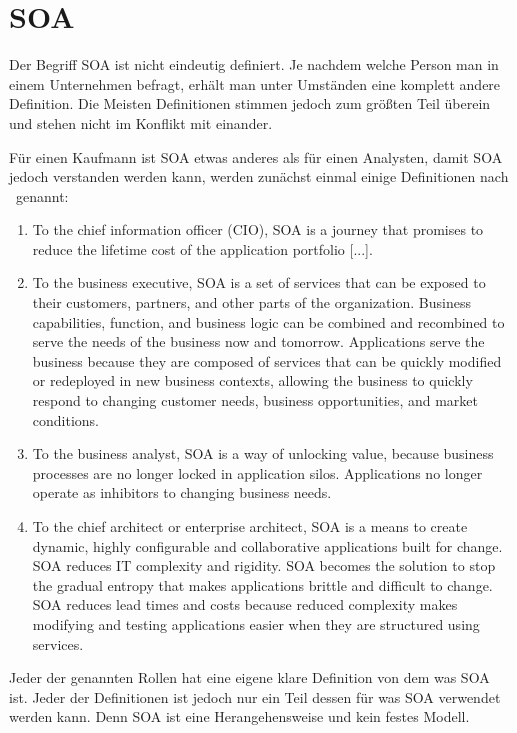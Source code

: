 \chapter{SOA}
\label{chap:soa}
Der Begriff SOA ist nicht eindeutig definiert. Je nachdem welche Person man in einem Unternehmen befragt, erhält man unter Umständen eine komplett andere Definition. \frqq Die Meisten Definitionen stimmen jedoch zum größten Teil überein und stehen nicht im Konflikt mit einander.\flqq\cite[vgl. Seite 6]{100QA}

Für einen Kaufmann ist SOA etwas anderes als für einen Analysten, damit SOA jedoch verstanden werden kann, werden zunächst einmal einige Definitionen nach \cite{100QA}\ genannt:
\begin{enumerate}
       \item \frqq To the chief information officer (CIO), SOA is a journey that
       promises to reduce the lifetime cost of the application portfolio [...].\flqq \cite[vgl. Seite 6]{100QA}
    
       \item \frqq To the business executive, SOA is a set of services that can be exposed to their customers, partners, and other parts of the organization. Business capabilities, function, and business logic can be combined and recombined to serve the needs of the business now and tomorrow. Applications serve the business because they are composed
       of services that can be quickly modified or redeployed in new
       business contexts, allowing the business to quickly respond to changing
       customer needs, business opportunities, and market conditions.\flqq \cite[vgl. Seite 6]{100QA}
       
       \item \frqq To the business analyst, SOA is a way of unlocking value, because business processes are no longer locked in application silos. Applications no longer operate as inhibitors to changing business needs.\flqq \cite[vgl. Seite 6]{100QA}
       
       \item \frqq To the chief architect or enterprise architect, SOA is a means to
       create dynamic, highly configurable and collaborative applications
       built for change. SOA reduces IT complexity and rigidity. SOA becomes the solution to stop the gradual entropy that makes applications
       brittle and difficult to change. SOA reduces lead times and costs
       because reduced complexity makes modifying and testing applications
       easier when they are structured using services.\flqq \cite[vgl. Seite ]{100QA}
\end{enumerate}
Jeder der genannten Rollen hat eine eigene klare Definition von dem was SOA ist. Jeder der Definitionen ist jedoch nur ein Teil dessen für was SOA verwendet werden kann. Denn SOA ist eine Herangehensweise und kein festes Modell.

